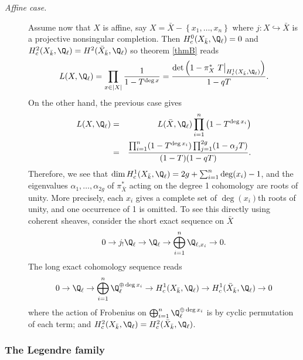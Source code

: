 \begin{description}
\item[\it Affine case.] 
Assume now that $X$ is affine, say $X= \bar X-\left\{x_1, \ldots, x_n\right\}$ where $j: X \hookrightarrow \bar X$ is a projective nonsingular completion. Then $H_c^0(X_{\bar k}, \Q_\ell) = 0$ and $H_c^2(X_{\bar k}, \Q_\ell) = H^2(\bar X_{\bar k}, \Q_\ell)$ so theorem \ref{thmB} reads
$$
L(X, \Q_\ell)  =  \prod_{x\in |X|}\frac{1}{1-T^{\deg x}} = \frac{\det\left(1-\pi_X^*\ T\big|_{H_c^1(X_{\bar k}, \Q_\ell)}\right)}{1-qT}.
$$
On the other hand, the previous case gives
\begin{eqnarray*}
L(X, \Q_\ell) & = & L(\bar X, \Q_\ell)\prod_{i=1}^n\left(1-T^{\deg x_i}\right) \\
& = & \frac{\prod_{i=1}^n(1-T^{\deg x_i})\prod_{j=1}^{2g}(1-\alpha_jT)}{(1-T)(1-qT)}.
\end{eqnarray*}
Therefore, we see that $\dim H_c^1(X_{\bar k}, \Q_\ell) = 2g+\sum_{i=1}^n \deg(x_i)-1$, and the eigenvalues $\alpha_1, \ldots, \alpha_{2g}$ of $\pi_{\bar X}^*$ acting on the degree 1 cohomology are roots of unity. More precisely, each $x_i$ gives a complete set of $\deg(x_i)$th roots of unity, and one occurrence of 1 is omitted.  To see this directly using coherent sheaves, consider the short exact sequence on $\bar X$
$$
0\to j_!\Q_\ell\to \Q_\ell\to\bigoplus_{i=1}^n \Q_{\ell, x_i}\to 0.
$$
The long exact cohomology sequence reads
$$
0\to \Q_\ell \to \bigoplus_{i=1}^n \Q_\ell^{\oplus \deg x_i} \to H_c^1(X_{\bar k}, \Q_\ell) \to H_c^1(\bar X_{\bar k}, \Q_\ell)\to 0
$$
where the action of Frobenius on $\bigoplus_{i=1}^n \Q_\ell^{\oplus \deg x_i}$ is by cyclic permutation of each term; and $H_c^2(X_{\bar k}, \Q_\ell) = H_c^2(\bar X_{\bar k}, \Q_\ell)$.
\end{description}

\subsubsection*{The Legendre family}

